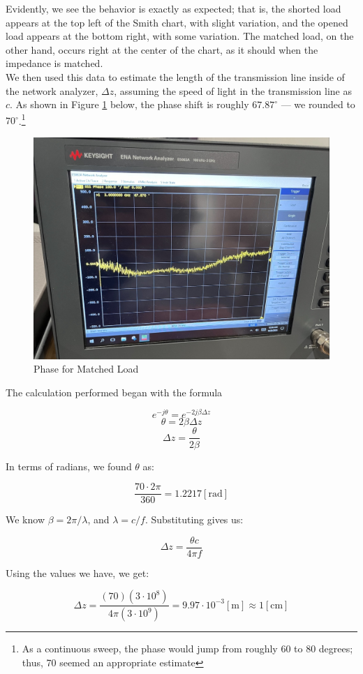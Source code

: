\documentclass[
	letterpaper, %
	10pt, %
]{CSUniSchoolLabReport}
\begin{document}
Evidently, we see the behavior is exactly as expected; that is, the shorted load appears at the top left of the Smith chart, with slight variation, and the opened load appears at the bottom right, with some variation. The matched load, on the other hand, occurs right at the center of the chart, as it should when the impedance is matched.\\

We then used this data to estimate the length of the transmission line inside of the network analyzer, $\Delta z$, assuming the speed of light in the transmission line as $c$. As shown in Figure \ref{fig:4} below, the phase shift is roughly $67.87^{\circ}$ — we rounded to $70^{\circ}$.\footnote{As a continuous sweep, the phase would jump from roughly 60 to 80 degrees; thus, 70 seemed an appropriate estimate}

\begin{figure}[H]
  \centering
  \includegraphics[width=.65\textwidth]{Figures/Lab One/MatchedPhase.png}
  \caption{Phase for Matched Load}
  \label{fig:4}
\end{figure}

The calculation performed began with the formula

$$e^{-j\theta}=e^{-2j\beta\Delta z}$$
$$\theta=2\beta\Delta z$$
$$\Delta z=\frac{\theta}{2\beta}$$

In terms of radians, we found $\theta$ as:

$$\frac{70\cdot2\pi}{360}=1.2217[\text{rad}]$$

We know $\beta=2\pi/\lambda$, and $\lambda=c/f$. Substituting gives us:

$$\Delta z = \frac{\theta c}{4\pi f}$$

Using the values we have, we get:

$$\Delta z=\frac{(70)(3\cdot10^8)}{4\pi(3\cdot10^9)}=9.97\cdot10^{-3}[\si{\meter}]\approx1[\si{\centi\meter}]$$
\end{document}
